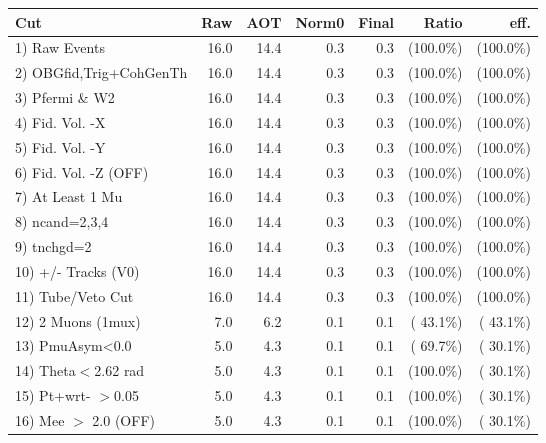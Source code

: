  \begin{table}[h!]\centering
 \begin{tabular}{||l||r|r|r|r|r|r||}
 \hline
 \hline
 Cut & Raw & AOT & Norm0 & Final & Ratio & eff.       \\
 \hline
  1) Raw Events           &         16.0 &         14.4 &          0.3 &          0.3 & (100.0\%) & (100.0\%) \\
  2) OBGfid,Trig+CohGenTh &         16.0 &         14.4 &          0.3 &          0.3 & (100.0\%) & (100.0\%) \\
  3) Pfermi \& W2         &         16.0 &         14.4 &          0.3 &          0.3 & (100.0\%) & (100.0\%) \\
  4) Fid. Vol. -X         &         16.0 &         14.4 &          0.3 &          0.3 & (100.0\%) & (100.0\%) \\
  5) Fid. Vol. -Y         &         16.0 &         14.4 &          0.3 &          0.3 & (100.0\%) & (100.0\%) \\
  6) Fid. Vol. -Z (OFF)   &         16.0 &         14.4 &          0.3 &          0.3 & (100.0\%) & (100.0\%) \\
  7) At Least 1 Mu        &         16.0 &         14.4 &          0.3 &          0.3 & (100.0\%) & (100.0\%) \\
  8) ncand=2,3,4          &         16.0 &         14.4 &          0.3 &          0.3 & (100.0\%) & (100.0\%) \\
  9) tnchgd=2             &         16.0 &         14.4 &          0.3 &          0.3 & (100.0\%) & (100.0\%) \\
 10) +/- Tracks (V0)      &         16.0 &         14.4 &          0.3 &          0.3 & (100.0\%) & (100.0\%) \\
 11) Tube/Veto Cut        &         16.0 &         14.4 &          0.3 &          0.3 & (100.0\%) & (100.0\%) \\
 12) 2 Muons (1mux)       &          7.0 &          6.2 &          0.1 &          0.1 & ( 43.1\%) & ( 43.1\%) \\
 13) PmuAsym<0.0          &          5.0 &          4.3 &          0.1 &          0.1 & ( 69.7\%) & ( 30.1\%) \\
 14) Theta$<$2.62 rad     &          5.0 &          4.3 &          0.1 &          0.1 & (100.0\%) & ( 30.1\%) \\
 15) Pt+wrt- $>$0.05      &          5.0 &          4.3 &          0.1 &          0.1 & (100.0\%) & ( 30.1\%) \\
 16) Mee $>$ 2.0  (OFF)   &          5.0 &          4.3 &          0.1 &          0.1 & (100.0\%) & ( 30.1\%) \\

\end{tabular}
\end{table}
